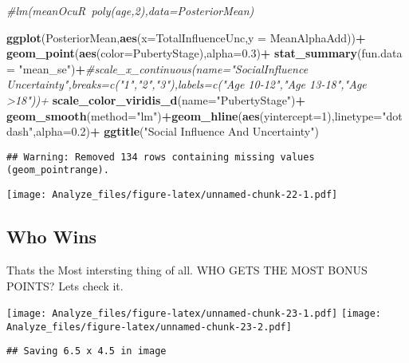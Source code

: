 \documentclass[]{article}
\newenvironment{Shaded}{\begin{snugshade}}{\end{snugshade}}
\newcommand{\KeywordTok}[1]{\textcolor[rgb]{0.13,0.29,0.53}{\textbf{#1}}}
\newcommand{\DataTypeTok}[1]{\textcolor[rgb]{0.13,0.29,0.53}{#1}}
\newcommand{\DecValTok}[1]{\textcolor[rgb]{0.00,0.00,0.81}{#1}}
\newcommand{\FloatTok}[1]{\textcolor[rgb]{0.00,0.00,0.81}{#1}}
\newcommand{\StringTok}[1]{\textcolor[rgb]{0.31,0.60,0.02}{#1}}
\newcommand{\CommentTok}[1]{\textcolor[rgb]{0.56,0.35,0.01}{\textit{#1}}}
\newcommand{\OperatorTok}[1]{\textcolor[rgb]{0.81,0.36,0.00}{\textbf{#1}}}
\newcommand{\NormalTok}[1]{#1}
\begin{document}
\begin{Shaded}
\begin{Highlighting}[]
\CommentTok{#lm(meanOcuR~poly(age,2),data=PosteriorMean)}

\KeywordTok{ggplot}\NormalTok{(PosteriorMean,}\KeywordTok{aes}\NormalTok{(}\DataTypeTok{x=}\NormalTok{TotalInfluenceUnc,}\DataTypeTok{y =}\NormalTok{ MeanAlphaAdd))}\OperatorTok{+}
\StringTok{  }\KeywordTok{geom_point}\NormalTok{(}\KeywordTok{aes}\NormalTok{(}\DataTypeTok{color=}\NormalTok{PubertyStage),}\DataTypeTok{alpha=}\FloatTok{0.3}\NormalTok{)}\OperatorTok{+}
\StringTok{  }\KeywordTok{stat_summary}\NormalTok{(}\DataTypeTok{fun.data =} \StringTok{"mean_se"}\NormalTok{)}\OperatorTok{+}\CommentTok{#scale_x_continuous(name="SocialInfluence Uncertainty",breaks=c("1","2","3"),labels=c("Age 10-12","Age 13-18","Age >18"))+}
\StringTok{  }\KeywordTok{scale_color_viridis_d}\NormalTok{(}\DataTypeTok{name=}\StringTok{"PubertyStage"}\NormalTok{)}\OperatorTok{+}
\StringTok{  }\KeywordTok{geom_smooth}\NormalTok{(}\DataTypeTok{method=}\StringTok{"lm"}\NormalTok{)}\OperatorTok{+}\KeywordTok{geom_hline}\NormalTok{(}\KeywordTok{aes}\NormalTok{(}\DataTypeTok{yintercept=}\DecValTok{1}\NormalTok{),}\DataTypeTok{linetype=}\StringTok{"dotdash"}\NormalTok{,}\DataTypeTok{alpha=}\FloatTok{0.2}\NormalTok{)}\OperatorTok{+}
\StringTok{  }\KeywordTok{ggtitle}\NormalTok{(}\StringTok{"Social Influence And Uncertainty"}\NormalTok{)}
\end{Highlighting}
\end{Shaded}

\begin{verbatim}
## Warning: Removed 134 rows containing missing values (geom_pointrange).
\end{verbatim}

\texttt{[image: Analyze\_files/figure-latex/unnamed-chunk-22-1.pdf]}

\subsection{Who Wins}\label{who-wins}

Thats the Most intersting thing of all. WHO GETS THE MOST BONUS POINTS?
Lets check it.

\texttt{[image: Analyze\_files/figure-latex/unnamed-chunk-23-1.pdf]}
\texttt{[image: Analyze\_files/figure-latex/unnamed-chunk-23-2.pdf]}

\begin{verbatim}
## Saving 6.5 x 4.5 in image
\end{verbatim}
\end{document}
